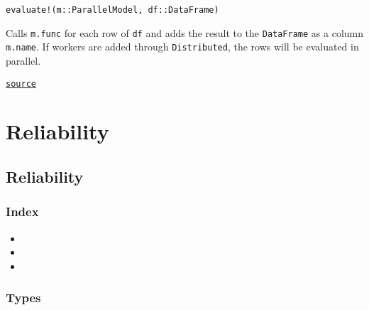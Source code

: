 \begin{adjustwidth}{2em}{0pt}


\begin{verbatim}
evaluate!(m::ParallelModel, df::DataFrame)
\end{verbatim}

Calls \texttt{m.func} for each row of \texttt{df} and adds the result to the \texttt{DataFrame} as a column \texttt{m.name}. If workers are added through \texttt{Distributed}, the rows will be evaluated in parallel.



\href{https://github.com/friesischscott/UncertaintyQuantification.jl/blob/f5ee6cce729f0d6a57979257379c942cdf42f86f/src/models/model.jl#L42-L47}{\texttt{source}}


\end{adjustwidth}

\chapter{Reliability}


\section{Reliability}



\label{10487444835713888107}{}


\subsection{Index}



\label{6663683553518785561}{}

\begin{itemize}
\item {}
\item {}
\item {}
\end{itemize}


\subsection{Types}



